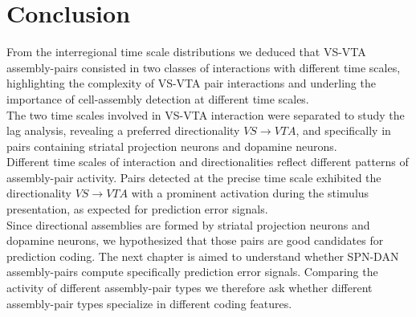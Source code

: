 \section{Conclusion}
From the interregional time scale distributions we deduced that VS-VTA assembly-pairs consisted in two classes of interactions with different time scales, highlighting the complexity of VS-VTA pair interactions and underling the importance of cell-assembly detection at different time scales.\\The two time scales involved in VS-VTA interaction were separated to study the lag analysis, revealing a preferred directionality $VS\rightarrow VTA$, and specifically in pairs containing striatal projection neurons and dopamine neurons.\\Different time scales of interaction and directionalities reflect different patterns of assembly-pair activity. Pairs detected at the precise time scale exhibited the directionality $VS\rightarrow VTA$ with a prominent activation during the stimulus presentation, as expected for prediction error signals.\\Since directional assemblies are formed by striatal projection neurons and dopamine neurons, we hypothesized that those pairs are good candidates for prediction coding. The next chapter is aimed to understand whether SPN-DAN assembly-pairs compute specifically prediction error signals. Comparing the activity of different assembly-pair types we therefore ask whether different assembly-pair types specialize in different coding features.\\

